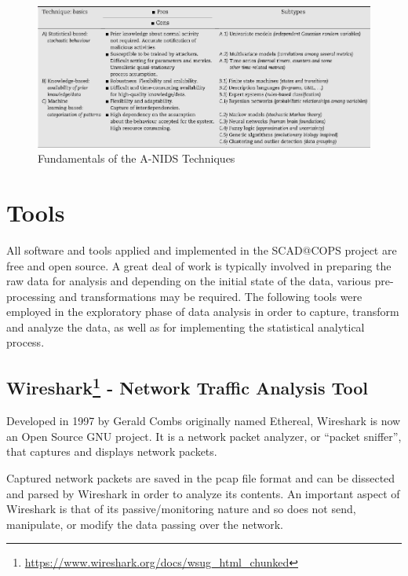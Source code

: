 \documentclass[12pt,]{article}
\let\rmarkdownfootnote\footnote%
\def\footnote{\protect\rmarkdownfootnote}
\begin{document}
\begin{figure}

{\centering \includegraphics{thesis_files/figure-latex/unnamed-chunk-11-1} 

}

\caption{Fundamentals of the A-NIDS Techniques}\label{fig:unnamed-chunk-11}
\end{figure}

\clearpage

\section{Tools}\label{tools}

All software and tools applied and implemented in the SCAD@COPS project
are free and open source. A great deal of work is typically involved in
preparing the raw data for analysis and depending on the initial state
of the data, various pre-processing and transformations may be required.
The following tools were employed in the exploratory phase of data
analysis in order to capture, transform and analyze the data, as well as
for implementing the statistical analytical process.

\subsection[Wireshark - Network Traffic Analysis
Tool]{Wireshark\footnote{\url{https://www.wireshark.org/docs/wsug_html_chunked}}
- Network Traffic Analysis
Tool}\label{wireshark2---network-traffic-analysis-tool}

Developed in 1997 by Gerald Combs originally named Ethereal, Wireshark
is now an Open Source GNU project. It is a network packet analyzer, or
``packet sniffer'', that captures and displays network packets.

Captured network packets are saved in the pcap file format and can be
dissected and parsed by Wireshark in order to analyze its contents. An
important aspect of Wireshark is that of its passive/monitoring nature
and so does not send, manipulate, or modify the data passing over the
network.
\end{document}
